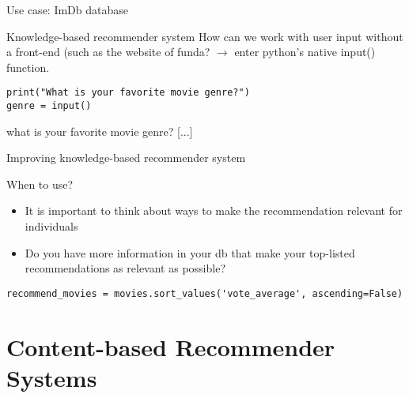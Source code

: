 \begin{frame}
\end{frame}

\begin{frame}{Use case: ImDb database}
\end{frame}


\begin{frame}[fragile]{Knowledge-based recommender system}
How can we work with user input without a front-end (such as the website of funda? 
\pause
$\rightarrow$ enter python's native \alert{input()} function.
\pause
\begin{verbatim}
print("What is your favorite movie genre?")
genre = input()
\end{verbatim}
\pause
\begin{lstlistingoutput}
what is your favorite movie genre?
[...]
\end{lstlistingoutput}
\end{frame}


\begin{frame}[fragile]{Improving knowledge-based recommender system}
\begin{block}{When to use?}
	\begin{itemize}
		\item <1-> It is important to think about ways to make the recommendation relevant for individuals
		\item <2-> Do you have more information in your db that make your top-listed recommendations as relevant as possible?
	\end{itemize}
\end{block}
\pause
\begin{verbatim}
recommend_movies = movies.sort_values('vote_average', ascending=False)
\end{verbatim}
\end{frame}

\section[Content-based RecSys]{Content-based Recommender Systems}

